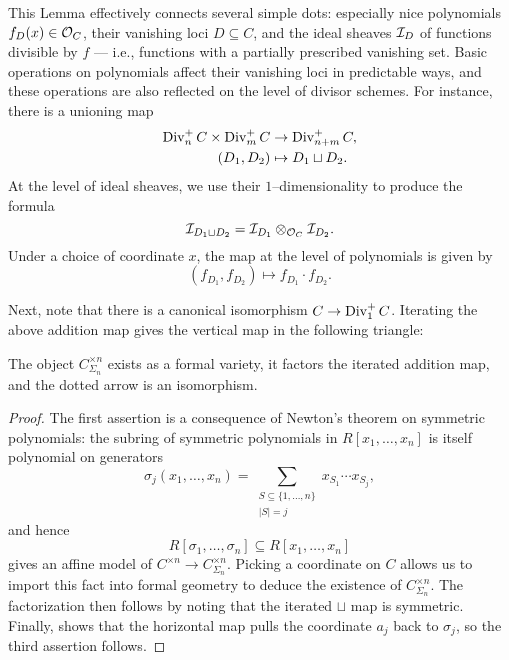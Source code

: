 \begin{remark}\label{DescriptionOfSqCupMapOnPolynomials}
This Lemma effectively connects several simple dots: especially nice polynomials $f_D(x) \in \mathcal{O}_C$, their vanishing loci $D \subseteq C$, and the ideal sheaves $\mathcal{I}_D$ of functions divisible by $f$ --- i.e., functions with a partially prescribed vanishing set.  Basic operations on polynomials affect their vanishing loci in predictable ways, and these operations are also reflected on the level of divisor schemes.  For instance, there is a unioning map
\begin{align*}
\operatorname{Div}_n^+ C \times \operatorname{Div}_m^+ C & \to \operatorname{Div}_{n+m}^+ C, \\
(D_1, D_2) & \mapsto D_1 \sqcup D_2.
\end{align*}
At the level of ideal sheaves, we use their $1$--dimensionality to produce the formula \[\mathcal{I}_{D_1 \sqcup D_2} = \mathcal{I}_{D_1} \otimes_{\mathcal{O}_C} \mathcal{I}_{D_2}.\]  Under a choice of coordinate $x$, the map at the level of polynomials is given by \[(f_{D_1}, f_{D_2}) \mapsto f_{D_1} \cdot f_{D_2}.\]
\end{remark}

Next, note that there is a canonical isomorphism $C \to \operatorname{Div}_1^+ C$.  Iterating the above addition map gives the vertical map in the following triangle:
\begin{center}
\end{center}
\begin{lemma}
The object $C^{\times n}_{\Sigma_n}$ exists as a formal variety, it factors the iterated addition map, and the dotted arrow is an isomorphism.
\end{lemma}
\begin{proof}
The first assertion is a consequence of Newton's theorem on symmetric polynomials: the subring of symmetric polynomials in $R[x_1, \ldots, x_n]$ is itself polynomial on generators \[\sigma_j(x_1, \ldots, x_n) = \sum_{\substack{S \subseteq \{1, \ldots, n\} \\ |S| = j}} x_{S_1} \cdots x_{S_j},\] and hence \[R[\sigma_1, \ldots, \sigma_n] \subseteq R[x_1, \ldots, x_n]\] gives an affine model of $C^{\times n} \to C^{\times n}_{\Sigma_n}$.  Picking a coordinate on $C$ allows us to import this fact into formal geometry to deduce the existence of $C^{\times n}_{\Sigma_n}$.  The factorization then follows by noting that the iterated $\sqcup$ map is symmetric.  Finally,  shows that the horizontal map pulls the coordinate $a_j$ back to $\sigma_j$, so the third assertion follows.
\end{proof}

